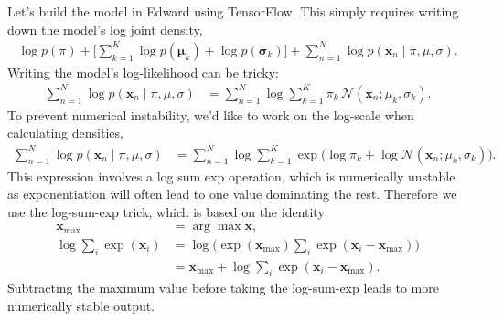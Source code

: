 Let's build the model in Edward using TensorFlow. This simply requires
writing down the model's log joint density,
\begin{align*}
  \log p(\pi) +
  \Big[ \sum_{k=1}^K \log p(\mathbf{\mu}_k) + \log
  p(\mathbf{\sigma}_k) \Big] +
  \sum_{n=1}^N \log p(\mathbf{x}_n \mid \pi, \mu, \sigma).
\end{align*}
Writing
the model's log-likelihood can be tricky:
\begin{align*}
  \sum_{n=1}^N \log p(\mathbf{x}_n \mid \pi, \mu, \sigma)
  &=
  \sum_{n=1}^N \log \sum_{k=1}^K \pi_k \, \mathcal{N}(\mathbf{x}_n ;
  \mu_k, \sigma_k).
\end{align*}
To prevent numerical instability, we'd like to work on the log-scale
when calculating densities,
\begin{align*}
  \sum_{n=1}^N \log p(\mathbf{x}_n \mid \pi, \mu, \sigma)
  &=
  \sum_{n=1}^N \log \sum_{k=1}^K \exp\Big(
  \log \pi_k + \log \mathcal{N}(\mathbf{x}_n ; \mu_k, \sigma_k)\Big).
\end{align*}
This expression involves a log sum exp operation, which is
numerically unstable as exponentiation will often lead to one value
dominating the rest. Therefore we use the log-sum-exp trick,
which is based on the identity
\begin{align*}
  \mathbf{x}_{\mathrm{max}}
  &=
  \arg\max \mathbf{x},
  \\
  \log \sum_i \exp(\mathbf{x}_i)
  &=
  \log \Big(\exp(\mathbf{x}_{\mathrm{max}}) \sum_i \exp(\mathbf{x}_i -
  \mathbf{x}_{\mathrm{max}})\Big)
  \\
  &=
  \mathbf{x}_{\mathrm{max}} + \log \sum_i \exp(\mathbf{x}_i -
  \mathbf{x}_{\mathrm{max}}).
\end{align*}
Subtracting the maximum value before taking the log-sum-exp leads to
more numerically stable output.
